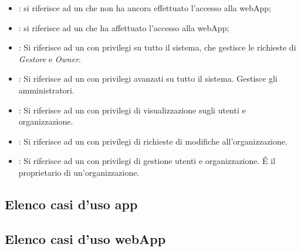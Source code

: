 \documentclass[../analisi-dei-requisiti]{subfiles}
\begin{document}
\begin{itemize}
  \item \textbf{}: si riferisce ad un  che non ha ancora effettuato l'accesso alla webApp;
  \item \textbf{}: si riferisce ad un  che ha affettuato l'accesso alla webApp;
  \item \textbf{}: Si riferisce ad un  con privilegi su tutto il sistema, che gestisce le richieste di \emph{Gestore} e \emph{Owner}.
  \item \textbf{}: Si riferisce ad un  con privilegi avanzati su tutto il sistema. Gestisce gli amministratori.
  \item \textbf{}: Si riferisce ad un  con privilegi di visualizzazione sugli utenti e organizzazione.
  \item \textbf{}: Si riferisce ad un  con privilegi di richieste di modifiche all'organizzazione.
  \item \textbf{}: Si riferisce ad un  con privilegi di gestione utenti e organizzazione. É il proprietario di un'organizzazione.
\end{itemize}


\subsection{Elenco casi d'uso app}
\label{sub:casi_duso_app}

\subsection{Elenco casi d'uso webApp}
\label{sub:casi_duso_webApp}

\end{document}
